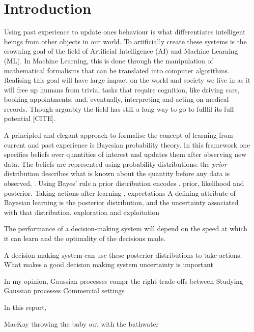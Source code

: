 \chapter{Introduction}  %

Using past experience to update ones behaviour is what differentiates intelligent beings from other objects in our world. To artificially create these systems is the crowning goal of the field of Artificial Intelligence (AI) and Machine Learning (ML). In Machine Learning, this is done through the manipulation of mathematical formalisms that can be translated into computer algorithms. Realising this goal will have large impact on the world and society we live in as it will free up humans from trivial tasks that require cognition, like driving cars, booking appointments, and, eventually, interpreting and acting on medical records. Though arguably the field has still a long way to go to fullfil its full potential [CITE].

A principled and elegant approach to formalise the concept of learning from current and past experience is Bayesian probability theory. In this framework one specifies beliefs over quantities of interest and updates them after observing new data. The beliefs are represented using probability distributions: the \emph{prior} distribution describes what is known about the quantity before any data is observed, . Using Bayes' rule 
a prior distribution encodes  . prior, likelihood and posterior. 
Taking actions after learning , expectations 
A defining attribute of Bayesian learning is the posterior distribution, and the uncertainty associated with that distribution. exploration and exploitation

The performance of a decision-making system will depend on the speed at which it can learn and the optimality of the decisions made.

A decision making system can use these posterior distributions to take actions. What makes a good decision making system
uncertainty is important

In my opinion, Gaussian processes compr the right trade-offs between 
Studying Gaussian processes 
Commercial settings

In this report, 

MacKay throwing the baby out with the bathwater



